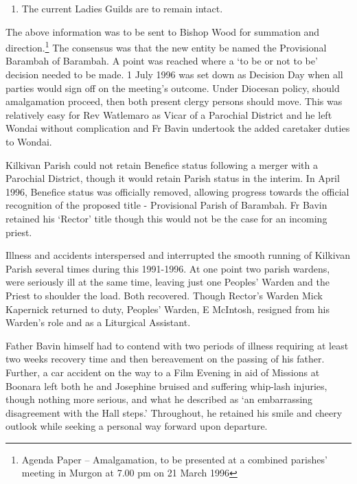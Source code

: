 \begin{enumerate}

\def\labelenumi{\arabic{enumi}.}

\setcounter{enumi}{5}

\item

  The current Ladies Guilds are to remain intact.

\end{enumerate}



\smallskip


The above information was to be sent to Bishop Wood for summation and direction.\footnote{Agenda Paper -- Amalgamation, to be presented at a combined parishes' meeting in Murgon at 7.00 pm on 21 March 1996} The consensus was that the new entity be named the Provisional Barambah of Barambah. A point was reached where a `to be or not to be' decision needed to be made. 1 July 1996 was set down as Decision Day when all parties would sign off on the meeting's outcome. Under Diocesan policy, should amalgamation proceed, then both present clergy persons should move. This was relatively easy for Rev Watlemaro as Vicar of a Parochial District and he left Wondai without complication and Fr Bavin undertook the added caretaker duties to Wondai.


Kilkivan Parish could not retain Benefice status following a merger with a Parochial District, though it would retain Parish status in the interim. In April 1996, Benefice status was officially removed, allowing progress towards the official recognition of the proposed title - Provisional Parish of Barambah. Fr Bavin retained his `Rector' title though this would not be the case for an incoming priest.



Illness and accidents interspersed and interrupted the smooth running of Kilkivan Parish several times during this 1991-1996. At one point two parish wardens, were seriously ill at the same time, leaving just one Peoples' Warden and the Priest to shoulder the load. Both recovered. Though Rector's Warden Mick Kapernick returned to duty, Peoples' Warden, E McIntosh, resigned from his Warden's role and as a Liturgical Assistant.



Father Bavin himself had to contend with two periods of illness requiring at least two weeks recovery time and then bereavement on the passing of his father. Further, a car accident on the way to a Film Evening in aid of Missions at Boonara left both he and Josephine bruised and suffering whip-lash injuries, though nothing more serious, and what he described as `an embarrassing disagreement with the Hall steps.' Throughout, he retained his smile and cheery outlook while seeking a personal way forward upon departure.



